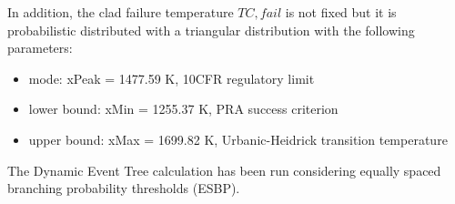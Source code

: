 In addition, the clad failure temperature $TC,fail$ is not fixed but it is probabilistic distributed with a triangular distribution with the following parameters:
\begin{itemize}
\item mode: xPeak = 1477.59 K, 10CFR regulatory limit
\item lower bound: xMin = 1255.37 K, PRA success criterion
\item upper bound: xMax = 1699.82 K, Urbanic-Heidrick transition temperature ~\cite{Urbanic1978}
\end{itemize}


The Dynamic Event Tree calculation has been run considering equally spaced branching probability thresholds (ESBP). 

